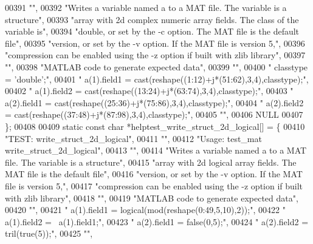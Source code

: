 \begin{DoxyCode}
{00391     \textcolor{stringliteral}{""},
00392     \textcolor{stringliteral}{"Writes a variable named a to a MAT file. The variable is a structure"},
00393     \textcolor{stringliteral}{"array with 2d complex numeric array fields. The class of the variable is"},
00394     \textcolor{stringliteral}{"double, or set by the -c option. The MAT file is the default file"},
00395     \textcolor{stringliteral}{"version, or set by the -v option. If the MAT file is version 5,"},
00396     \textcolor{stringliteral}{"compression can be enabled using the -z option if built with zlib library"},
00397     \textcolor{stringliteral}{""},
00398     \textcolor{stringliteral}{"MATLAB code to generate expected data"},
00399     \textcolor{stringliteral}{""},
00400     \textcolor{stringliteral}{"    classtype = 'double';"},
00401     \textcolor{stringliteral}{"    a(1).field1 = cast(reshape((1:12)+j*(51:62),3,4),classtype);"},
00402     \textcolor{stringliteral}{"    a(1).field2 = cast(reshape((13:24)+j*(63:74),3,4),classtype);"},
00403     \textcolor{stringliteral}{"    a(2).field1 = cast(reshape((25:36)+j*(75:86),3,4),classtype);"},
00404     \textcolor{stringliteral}{"    a(2).field2 = cast(reshape((37:48)+j*(87:98),3,4),classtype);"},
00405     \textcolor{stringliteral}{""},
00406     NULL
00407 \};
00408 
00409 \textcolor{keyword}{static} \textcolor{keyword}{const} \textcolor{keywordtype}{char} *helptest\_write\_struct\_2d\_logical[] = \{
00410     \textcolor{stringliteral}{"TEST: write\_struct\_2d\_logical"},
00411     \textcolor{stringliteral}{""},
00412     \textcolor{stringliteral}{"Usage: test\_mat write\_struct\_2d\_logical"},
00413     \textcolor{stringliteral}{""},
00414     \textcolor{stringliteral}{"Writes a variable named a to a MAT file. The variable is a structure"},
00415     \textcolor{stringliteral}{"array with 2d logical array fields. The MAT file is the default file"},
00416     \textcolor{stringliteral}{"version, or set by the -v option. If the MAT file is version 5,"},
00417     \textcolor{stringliteral}{"compression can be enabled using the -z option if built with zlib library"},
00418     \textcolor{stringliteral}{""},
00419     \textcolor{stringliteral}{"MATLAB code to generate expected data"},
00420     \textcolor{stringliteral}{""},
00421     \textcolor{stringliteral}{"    a(1).field1 = logical(mod(reshape(0:49,5,10),2));"},
00422     \textcolor{stringliteral}{"    a(1).field2 = ~a(1).field1;"},
00423     \textcolor{stringliteral}{"    a(2).field1 = false(0,5);"},
00424     \textcolor{stringliteral}{"    a(2).field2 = tril(true(5));"},
00425     \textcolor{stringliteral}{""},
}
\end{DoxyCode}

